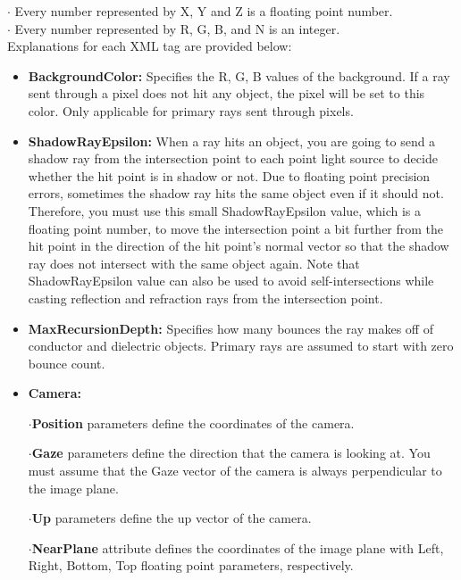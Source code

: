 \documentclass[12pt]{article}
\begin{document}
$\cdot$ Every number represented by X, Y and Z is a floating point number. \\

$\cdot$ Every number represented by R, G, B, and N is an integer. \\

\noindent Explanations for each XML tag are provided below:

\begin{itemize}

\item \textbf{BackgroundColor:} Specifies the R, G, B values of
the background. If a ray sent through a pixel does not hit
any object, the pixel will be set to this color. Only
applicable for primary rays sent through pixels.

\item \textbf{ShadowRayEpsilon:} When  a  ray  hits  an  object,  you
are  going  to  send  a shadow  ray from  the intersection  point  to
each point  light  source to decide whether the hit point is in shadow
or not.  Due  to  floating  point  precision  errors, sometimes  the
shadow ray  hits  the  same  object even  if  it  should  not.
Therefore,  you must use this small ShadowRayEpsilon value, which is a
floating point number, to move the intersection point a bit further from
the hit point in the direction of the hit point's normal vector  so that
the shadow ray does not intersect with the same object again. Note that
ShadowRayEpsilon value can also be used to avoid self-intersections
while casting reflection and refraction rays from the intersection point.

\item \textbf{MaxRecursionDepth:} Specifies how many bounces the ray
makes off of conductor and dielectric objects.  Primary  rays are
assumed to start with zero bounce count.

\item \textbf{Camera:} 

$\cdot$\textbf{Position}  parameters  define  the  coordinates  of  the  camera.

$\cdot$\textbf{Gaze}  parameters define the direction that the camera is
looking at. You must assume that the Gaze vector of the camera is always
perpendicular to the image plane.

$\cdot$\textbf{Up} parameters define the up vector of 
the  camera.

$\cdot$\textbf{NearPlane}  attribute  defines  the  coordinates  of  the
image  plane  with Left, Right, Bottom, Top floating point parameters,
       respectively.


\end{itemize}
\end{document}
